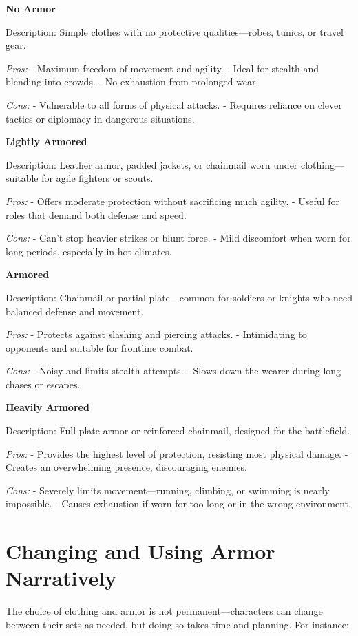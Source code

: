 \textbf{No Armor}

Description: Simple clothes with no protective qualities---robes,
tunics, or travel gear.

\emph{Pros:} - Maximum freedom of movement and agility. - Ideal for
stealth and blending into crowds. - No exhaustion from prolonged wear.

\emph{Cons:} - Vulnerable to all forms of physical attacks. - Requires
reliance on clever tactics or diplomacy in dangerous situations.

\textbf{Lightly Armored}

Description: Leather armor, padded jackets, or chainmail worn under
clothing---suitable for agile fighters or scouts.

\emph{Pros:} - Offers moderate protection without sacrificing much
agility. - Useful for roles that demand both defense and speed.

\emph{Cons:} - Can't stop heavier strikes or blunt force. - Mild
discomfort when worn for long periods, especially in hot climates.

\textbf{Armored}

Description: Chainmail or partial plate---common for soldiers or knights
who need balanced defense and movement.

\emph{Pros:} - Protects against slashing and piercing attacks. -
Intimidating to opponents and suitable for frontline combat.

\emph{Cons:} - Noisy and limits stealth attempts. - Slows down the
wearer during long chases or escapes.

\textbf{Heavily Armored}

Description: Full plate armor or reinforced chainmail, designed for the
battlefield.

\emph{Pros:} - Provides the highest level of protection, resisting most
physical damage. - Creates an overwhelming presence, discouraging
enemies.

\emph{Cons:} - Severely limits movement---running, climbing, or swimming
is nearly impossible. - Causes exhaustion if worn for too long or in the
wrong environment.

\hypertarget{changing-and-using-armor-narratively}{%
\section{Changing and Using Armor
Narratively}\label{changing-and-using-armor-narratively}}

The choice of clothing and armor is not permanent---characters can
change between their sets as needed, but doing so takes time and
planning. For instance:


